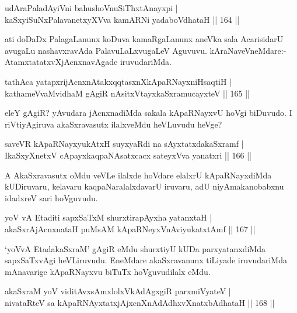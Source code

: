 
\begin{shl}
udAraPaladAyiVni bahushoV\s nuSiThxtAnayxpi |\\
kaSxyiSuNxPalavanetxyXVva kamARNi yadaboVdhataH \hfill || 164 ||
\end{shl}

\begin{artha}
ati doDaDx PalagaLanunx koDuva kamaRgaLanunx aneVka sala AcarisidarU \-avugaLu nashavxravAda PalavuLaLxvugaLeV Aguvuvu. kAraNaveVneMdare:- AtamxtatatxvXjAcnxnavAgade iruvudariMda.
\end{artha}

\begin{shl}
tathAca yatapxrijAcnxnAtakxqqtasxnXkApaRNayxniHsaqtiH |\\
kathameVvaMvidhaM gAgiR nAsitxVtayxkaSxramucayxteV \hfill || 165 ||
\end{shl}

\begin{artha}
eleY gAgiR? yAvudara jAcnxnadiMda sakala kApaRNayxvU hoVgi biDuvudo. I riVtiyAgiruva akaSxravasutx ilalxveMdu heVLuvudu heVge?
\end{artha}

\begin{shl}
saveVR kApaRNayxyukAtxH suyxyaRdi na sAyxtatxdakaSxramf |\\
IkaSxyXnetxV cApayxkaqpaNAsatxcacx sateyxVva yanatxri \hfill || 166 ||
\end{shl}

\begin{artha}
A AkaSxravasutx oMdu veVLe ilalxde hoVdare elalxrU kApaRNayxdiMda kUDiruvaru, kelavaru kaqpaNaralalxdavarU iruvaru, adU niyAmakanobabxnu idadxreV sari hoVguvudu.
\end{artha}

\begin{shl}
yoV vA Etaditi sapxSaTxM shurxtirapAyxha yatanxtaH |\\
akaSxrAjAcnxnataH puMsAM kApaRNeyxVnAviyukatxtAmf \hfill || 167 ||
\end{shl}

\begin{artha}
`yoVvA EtadakaSxraM' gAgiR eMdu shurxtiyU kUDa parxyatanxdiMda sapxSaTxvAgi heVLiruvudu. EneMdare akaSxravanunx tiLiyade iruvudariMda mAnavarige kApaRNayxvu biTuTx hoVguvudilalx eMdu.
\end{artha}

\begin{shl}
akaSxraM yoV viditAvx\s sAmxlolxVkAdAgxgiR parxmiVyateV |\\
nivataRteV sa kApaRNAyxtatxjAjxcnXnAdAdhxvXnatxbAdhataH \hfill || 168 ||
\end{shl}

